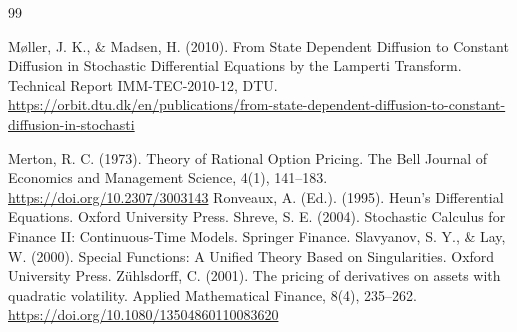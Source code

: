 \documentclass[a4paper,11pt]{article}
\begin{document}
\begin{thebibliography}{99}
{\sloppy{} M\o{}ller, J. K., \& Madsen, H. (2010). From State Dependent Diffusion to Constant Diffusion in Stochastic Differential Equations by the Lamperti Transform. Technical Report IMM-TEC-2010-12, DTU. \url{https://orbit.dtu.dk/en/publications/from-state-dependent-diffusion-to-constant-diffusion-in-stochasti}\par}
 Merton, R. C. (1973). Theory of Rational Option Pricing. The Bell Journal of Economics and Management Science, 4(1), 141--183. \url{https://doi.org/10.2307/3003143}
 Ronveaux, A. (Ed.). (1995). Heun's Differential Equations. Oxford University Press.
 Shreve, S. E. (2004). Stochastic Calculus for Finance II: Continuous-Time Models. Springer Finance.
 Slavyanov, S. Y., \& Lay, W. (2000). Special Functions: A Unified Theory Based on Singularities. Oxford University Press.
 Z\"{u}hlsdorff, C. (2001). The pricing of derivatives on assets with quadratic volatility. Applied Mathematical Finance, 8(4), 235--262. \url{https://doi.org/10.1080/13504860110083620}
\end{thebibliography}
\end{document}

